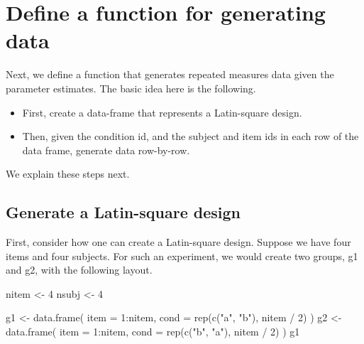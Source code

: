 \documentclass[
  12pt,
]{krantz}
\newenvironment{Shaded}{\begin{snugshade}}{\end{snugshade}}
\newcommand{\AttributeTok}[1]{\textcolor[rgb]{0.77,0.63,0.00}{#1}}
\newcommand{\DecValTok}[1]{\textcolor[rgb]{0.00,0.00,0.81}{#1}}
\newcommand{\FunctionTok}[1]{\textcolor[rgb]{0.00,0.00,0.00}{#1}}
\newcommand{\NormalTok}[1]{#1}
\newcommand{\OtherTok}[1]{\textcolor[rgb]{0.56,0.35,0.01}{#1}}
\newcommand{\SpecialCharTok}[1]{\textcolor[rgb]{0.00,0.00,0.00}{#1}}
\newcommand{\StringTok}[1]{\textcolor[rgb]{0.31,0.60,0.02}{#1}}
\providecommand{\tightlist}{%
  \setlength{\itemsep}{0pt}\setlength{\parskip}{0pt}}
\theoremstyle{definition}
\theoremstyle{definition}
\theoremstyle{definition}
\theoremstyle{definition}
\theoremstyle{remark}
\begin{document}
\hypertarget{define-a-function-for-generating-data}{%
\section{Define a function for generating data}\label{define-a-function-for-generating-data}}

Next, we define a function that generates repeated measures data given the parameter estimates. The basic idea here is the following.

\begin{itemize}
\tightlist
\item
  First, create a data-frame that represents a Latin-square design.
\item
  Then, given the condition id, and the subject and item ids in each row of the data frame, generate data row-by-row.
\end{itemize}

We explain these steps next.

\hypertarget{generate-a-latin-square-design}{%
\subsection{Generate a Latin-square design}\label{generate-a-latin-square-design}}

First, consider how one can create a Latin-square design. Suppose we have four items and four subjects. For such an experiment, we would create two groups, g1 and g2, with the following layout.

\begin{Shaded}
\begin{Highlighting}[]
\NormalTok{nitem }\OtherTok{\textless{}{-}} \DecValTok{4}
\NormalTok{nsubj }\OtherTok{\textless{}{-}} \DecValTok{4}

\NormalTok{g1 }\OtherTok{\textless{}{-}} \FunctionTok{data.frame}\NormalTok{(}
  \AttributeTok{item =} \DecValTok{1}\SpecialCharTok{:}\NormalTok{nitem,}
  \AttributeTok{cond =} \FunctionTok{rep}\NormalTok{(}\FunctionTok{c}\NormalTok{(}\StringTok{"a"}\NormalTok{, }\StringTok{"b"}\NormalTok{), nitem }\SpecialCharTok{/} \DecValTok{2}\NormalTok{)}
\NormalTok{)}
\NormalTok{g2 }\OtherTok{\textless{}{-}} \FunctionTok{data.frame}\NormalTok{(}
  \AttributeTok{item =} \DecValTok{1}\SpecialCharTok{:}\NormalTok{nitem,}
  \AttributeTok{cond =} \FunctionTok{rep}\NormalTok{(}\FunctionTok{c}\NormalTok{(}\StringTok{"b"}\NormalTok{, }\StringTok{"a"}\NormalTok{), nitem }\SpecialCharTok{/} \DecValTok{2}\NormalTok{)}
\NormalTok{)}
\NormalTok{g1}
\end{Highlighting}
\end{Shaded}
\end{document}
